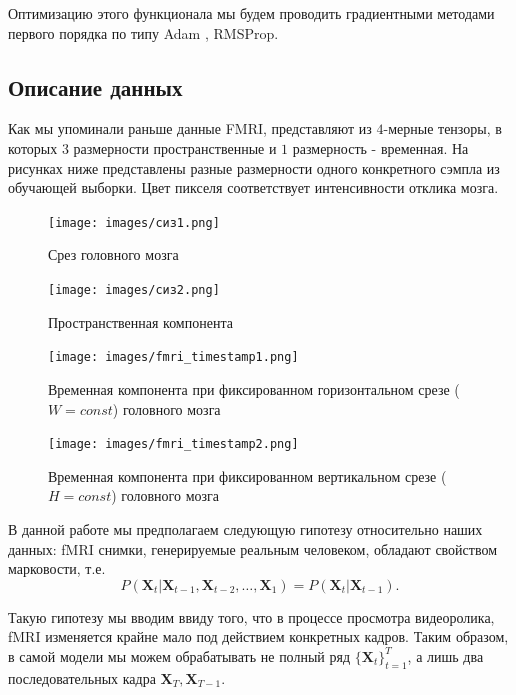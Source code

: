 \documentclass{article}
\renewcommand{\vec}[1]{\mathbf{#1}}
\begin{document}
 Оптимизацию этого функционала мы будем проводить градиентными методами первого порядка по типу Adam \cite{kingma2014adam}, RMSProp.

\subsection{Описание данных}

Как мы упоминали раньше данные FMRI, представляют из $4$-мерные тензоры, в которых $3$ размерности пространственные и $1$ размерность - временная. На рисунках ниже представлены разные размерности одного конкретного сэмпла из обучающей выборки. Цвет пикселя соответствует интенсивности отклика мозга.

\begin{figure}[h!]
        \centering
        \texttt{[image: images/сиз1.png]} 
        \caption{Срез головного мозга}
        \label{fig:enter-label}
\end{figure}

\begin{figure}[h!]
        \centering
        \texttt{[image: images/сиз2.png]} 
        \caption{Пространственная компонента}
        \label{fig:enter-label}
\end{figure}

\begin{figure}[h!]
        \centering
        \texttt{[image: images/fmri\_timestamp1.png]} 
        \caption{Временная компонента при фиксированном горизонтальном срезе ($W = const$) головного мозга}
        \label{fmri_timestamp1}
\end{figure}
\newpage
\begin{figure}[h!]
        \centering
        \texttt{[image: images/fmri\_timestamp2.png]} 
        \caption{Временная компонента при фиксированном вертикальном срезе ($H = const$) головного мозга}
        \label{fmri_timestamp2}
\end{figure}

В данной работе мы предполагаем следующую гипотезу относительно наших данных: fMRI снимки, генерируемые реальным человеком, обладают свойством марковости, т.е.
$$P(\vec{X}_t | \vec{X}_{t-1}, \vec{X}_{t-2}, \dots, \vec{X}_1 ) = P(\vec{X}_t| \vec{X}_{t-1}).$$

Такую гипотезу мы вводим ввиду того, что в процессе просмотра видеоролика, fMRI изменяется крайне мало под действием конкретных кадров. Таким образом, в самой модели мы можем обрабатывать не полный ряд $\{\vec{X}_t\}_{t=1}^T$, а лишь два  последовательных кадра $\vec{X}_{T}, \vec{X}_{T-1}$.
\end{document}
